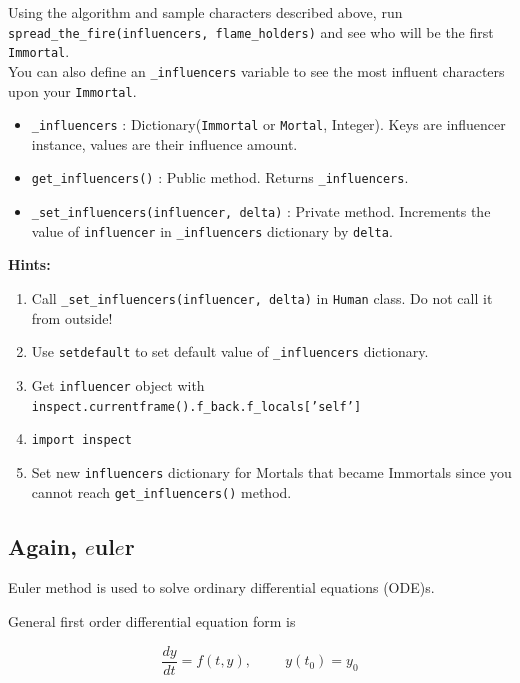 \documentclass[a4paper]{article}
\begin{document}
Using the algorithm and sample characters described above, run\\ \texttt{spread\_the\_fire(influencers, flame\_holders)} and see who will be the first \texttt{Immortal}.\\
You can also define an \texttt{\_influencers} variable to see the most influent characters upon your \texttt{Immortal}.

\begin{itemize}
    \item \texttt{\_influencers} : Dictionary(\texttt{Immortal} or \texttt{Mortal}, Integer). Keys are influencer instance, values are their influence amount.
    \item \texttt{get\_influencers()} : Public method. Returns \texttt{\_influencers}.
    \item \texttt{\_set\_influencers(influencer, delta)} : Private method. Increments the value of \texttt{influencer} in \texttt{\_influencers} dictionary by \texttt{delta}.
\end{itemize}

\textbf{Hints:}
\begin{enumerate}
    \item Call \texttt{\_set\_influencers(influencer, delta)} in \texttt{Human} class. Do not call it from outside!
    \item Use \texttt{setdefault} to set default value of \texttt{\_influencers} dictionary.
    \item Get \texttt{influencer} object with \texttt{inspect.currentframe().f\_back.f\_locals['self']}
    \item \texttt{import inspect}
    \item Set new \texttt{influencers} dictionary for Mortals that became Immortals since you cannot reach \texttt{get\_influencers()} method.
\end{enumerate}

\newpage
\subsection{Again, $e$ul$e$r}

Euler method is used to solve ordinary differential equations (ODE)s.

General first order differential equation form is

\begin{equation}
	\frac{dy}{dt} = f(t, y), \hspace{1cm} y(t_0) = y_0
\end{equation}
\end{document}
